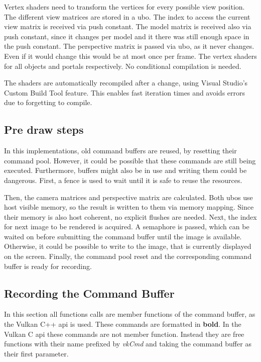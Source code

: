 Vertex shaders need to transform the vertices for every possible view position. The different view matrices are stored in a \gls{ubo}. The index to access the current view matrix is received via push constant. The model matrix is received also via push constant, since it changes per model and it there was still enough space in the push constant. The perspective matrix is passed via \gls{ubo}, as it never changes. Even if it would change this would be at most once per frame. The vertex shaders for all objects and portals respectively. No conditional compilation is needed.


The shaders are automatically recompiled after a change, using Visual Studio's Custom Build Tool feature. This enables fast iteration times and avoids errors due to forgetting to compile.

\subsection{Pre draw steps}

In this implementations, old command buffers are reused, by resetting their command pool. However, it could be possible that these commands are still being executed. Furthermore, buffers might also be in use and writing them could be dangerous. First, a fence is used to wait until it is safe to reuse the resources.

Then, the camera matrices and perspective matrix are calculated. Both \glspl{ubo} use host visible memory, so the result is written to them via memory mapping. Since their memory is also host coherent, no explicit flushes are needed.
Next, the index for next image to be rendered is acquired. A semaphore is passed, which can be waited on before submitting the command buffer until the image is available. Otherwise, it could be possible to write to the image, that is currently displayed on the screen.
Finally, the command pool reset and the corresponding command buffer is ready for recording.

\subsection{Recording the Command Buffer}

In this section all functions calls are member functions of the command buffer, as the Vulkan C++ \gls{api} is used. These commands are formatted in \textbf{bold}. In the Vulkan C \gls{api} these commands are not member function. Instead they are free functions with their name prefixed by \textit{vkCmd} and taking the command buffer as their first parameter.

